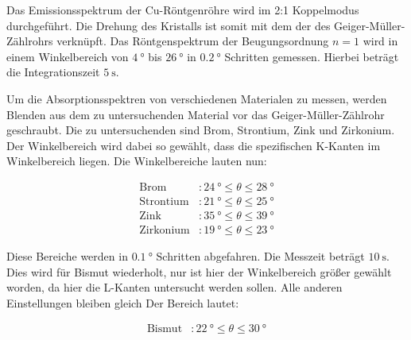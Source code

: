 Das Emissionsspektrum der Cu-Röntgenröhre wird im 2:1 Koppelmodus durchgeführt.
Die Drehung des Kristalls ist somit mit dem der des Geiger-Müller-Zählrohrs verknüpft.
Das Röntgenspektrum der Beugungsordnung $n=1$ wird in einem Winkelbereich von $\SI{4}{\degree}$ bis $\SI{26}{\degree}$ in $\SI{0.2}{\degree}$ Schritten gemessen.
Hierbei beträgt die Integrationszeit $\SI{5}{\second}$.

Um die Absorptionsspektren von verschiedenen Materialen zu messen, werden Blenden aus dem zu untersuchenden Material vor das Geiger-Müller-Zählrohr geschraubt.
Die zu untersuchenden sind Brom, Strontium, Zink und Zirkonium.
Der Winkelbereich wird dabei so gewählt, dass die spezifischen K-Kanten im Winkelbereich liegen.
Die Winkelbereiche lauten nun:

\begin{align*}
  \text{Brom} &: \SI{24}{\degree} \leq \theta \leq \SI{28}{\degree} \\
  \text{Strontium} &: \SI{21}{\degree} \leq \theta \leq \SI{25}{\degree} \\
  \text{Zink} &: \SI{35}{\degree} \leq \theta \leq \SI{39}{\degree} \\
  \text{Zirkonium} &: \SI{19}{\degree} \leq \theta \leq \SI{23}{\degree}
\end{align*}

Diese Bereiche werden in $\SI{0.1}{\degree}$ Schritten abgefahren.
Die Messzeit beträgt $\SI{10}{\second}$.
Dies wird für Bismut wiederholt, nur ist hier der Winkelbereich größer gewählt worden, da hier die L-Kanten untersucht werden sollen.
Alle anderen Einstellungen bleiben gleich
Der Bereich lautet:

\begin{align*}
  \text{Bismut} &: \SI{22}{\degree} \leq \theta \leq \SI{30}{\degree}
\end{align*}
\FloatBarrier
